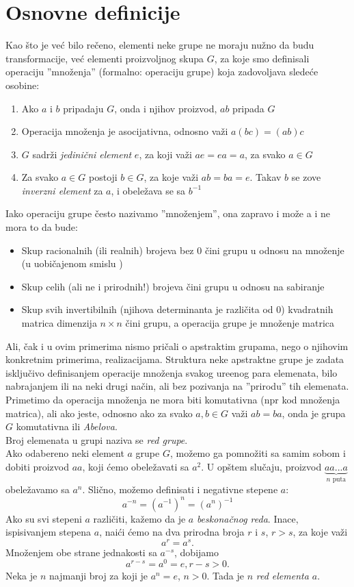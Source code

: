 \documentclass[times, utf8, diplomski]{fer}
\theoremstyle{plain}
\theoremstyle{definition}
\begin{document}
\section{Osnovne definicije}
Kao \v sto je ve\'c bilo re\v ceno, elementi neke grupe ne moraju nu\v zno da budu transformacije, ve\'c elementi proizvoljnog skupa $G$, za koje smo definisali operaciju ''mno\v zenja'' (formalno: operaciju grupe) koja zadovoljava slede\'ce osobine:
\begin{enumerate}
  \item Ako $a$ i $b$ pripadaju $G$, onda i njihov proizvod, $ab$ pripada $G$
  \item Operacija mno\v zenja je asocijativna, odnosno va\v zi $a(bc) = (ab)c$
  \item $G$ sadr\v zi \emph{jedini\v cni element} $e$, za koji va\v zi $ae = ea = a$, za svako $a\in G$
  \item Za svako $a\in G$ postoji $b\in G$, za koje va\v zi $ab = ba = e$. Takav $b$ se zove \emph{inverzni element} za $a$, i obele\v zava se sa $b^{-1}$
\end{enumerate}
Iako operaciju grupe \v cesto nazivamo ''mno\v zenjem'', ona zapravo i mo\v ze a i ne mora to da bude:
\begin{itemize}
  \item Skup racionalnih (ili realnih) brojeva bez $0$ \v cini grupu u odnosu na mno\v zenje (u uobi\v cajenom smislu )
  \item Skup celih (ali ne i prirodnih!) brojeva \v cini grupu u odnosu na sabiranje
  \item Skup svih invertibilnih (njihova determinanta je razli\v cita od $0$) kvadratnih matrica dimenzija $n\times n$ \v cini grupu, a operacija grupe je mno\v zenje matrica
\end{itemize}
Ali, \v cak i u ovim primerima nismo pri\v cali o apstraktim grupama, nego o njihovim konkretnim primerima, realizacijama. Struktura neke apstraktne grupe je zadata isklju\v civo definisanjem operacije mno\v zenja svakog ure\dj enog para elemenata, bilo nabrajanjem ili na neki drugi na\v cin, ali bez pozivanja na ''prirodu'' tih elemenata.\\
Primetimo da operacija mno\v zenja ne mora biti komutativna (npr kod mno\v zenja matrica), ali ako jeste, odnosno ako za svako $a, b\in G$ va\v zi $ab = ba$, onda je grupa $G$ komutativna ili \emph{Abelova}.\\
Broj elemenata u grupi naziva se \emph{red grupe}.\\
Ako odabereno neki element $a$ grupe $G$, mo\v zemo ga pomno\v ziti sa samim sobom i dobiti proizvod $aa$, koji \'cemo obele\v zavati sa $a^2$. U op\v stem slu\v caju, proizvod $\underbrace{aa...a}_{n\text{ puta}}$ obele\v zavamo sa $a^n$. Sli\v cno, mo\v zemo definisati i negativne stepene $a$:
$$a^{-n} = (a^{-1})^n = (a^n)^{-1}$$
Ako su svi stepeni $a$ razli\v citi, ka\v zemo da je $a$ \emph{beskona\v cnog reda}. Inace, ispisivanjem stepena $a$, nai\'ci \'cemo na dva prirodna broja $r$ i $s$, $r>s$, za koje va\v zi
$$a^r = a^s.$$
Mno\v zenjem obe strane jednakosti sa $a^{-s}$, dobijamo
$$a^{r-s} = a^0 = e, r-s>0.$$
Neka je $n$ najmanji broj za koji je $a^n = e$, $n>0$. Tada je $n$ \emph{red elementa $a$}.
\end{document}
